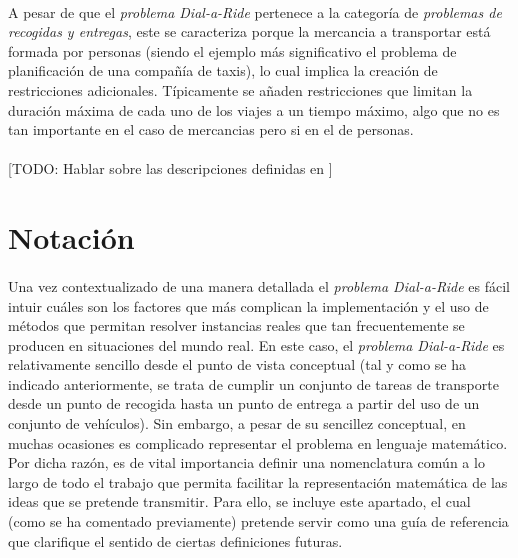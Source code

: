 \documentclass{subfiles}
\begin{document}
        \paragraph{}
        A pesar de que el \emph{problema Dial-a-Ride} pertenece a la categoría de \emph{problemas de recogidas y entregas}, este se caracteriza porque la mercancia a transportar está formada por personas (siendo el ejemplo más significativo el problema de planificación de una compañía de taxis), lo cual implica la creación de restricciones adicionales. Típicamente se añaden restricciones que limitan la duración máxima de cada uno de los viajes a un tiempo máximo, algo que no es tan importante en el caso de mercancias pero si en el de personas.

        \paragraph{}
        [TODO: Hablar sobre las descripciones definidas en \cite{cordeau2007dial}]

    \section{Notación}
    \label{sec:formulation_notation}

      \paragraph{}
      Una vez contextualizado de una manera detallada el \emph{problema Dial-a-Ride} es fácil intuir cuáles son los factores que más complican la implementación y el uso de métodos que permitan resolver instancias reales que tan frecuentemente se producen en situaciones del mundo real. En este caso, el \emph{problema Dial-a-Ride} es relativamente sencillo desde el punto de vista conceptual (tal y como se ha indicado anteriormente, se trata de cumplir un conjunto de tareas de transporte desde un punto de recogida hasta un punto de entrega a partir del uso de un conjunto de vehículos). Sin embargo, a pesar de su sencillez conceptual, en muchas ocasiones es complicado representar el problema en lenguaje matemático. Por dicha razón, es de vital importancia definir una nomenclatura común a lo largo de todo el trabajo que permita facilitar la representación matemática de las ideas que se pretende transmitir. Para ello, se incluye este apartado, el cual (como se ha comentado previamente) pretende servir como una guía de referencia que clarifique el sentido de ciertas definiciones futuras.
\end{document}
